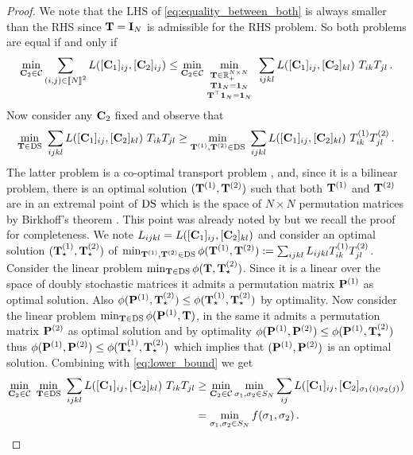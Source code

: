 \begin{proof}
	We note that the LHS of \cref{eq:equality_between_both} is always smaller than the RHS since ${\mathbf{T}} = \mathbf{I}_{N}$ is admissible for the RHS problem. So both problems are equal if and only if
	\begin{equation}
		\min_{\mC_2 \in \mathcal{C}} \sum_{(i,j) \in \integ{N}^2} L([\mC_1]_{ij}, [\mC_2]_{ij}) \leq \min_{\mC_2 \in \mathcal{C}} \min_{\begin{smallmatrix} \mT \in \R_{+}^{N \times N} \\ \mT \one_N = \one_N \\ \mT^\top \one_N = \one_N \end{smallmatrix}} \ \sum_{ijkl} L([\mC_1]_{ij}, [\mC_2]_{kl}) \ T_{ik} T_{jl}\,.
	\end{equation}
	Now consider any ${\mathbf{C}}_2$ fixed and observe that
	\begin{equation}
		\label{eq:lower_bound}
		\min_{\mT \in \DS} \ \sum_{ijkl} L([\mC_1]_{ij}, [\mC_2]_{kl}) \ T_{ik} T_{jl} \geq \min_{\mT^{(1)}, \mT^{(2)} \in \DS} \ \sum_{ijkl} L([\mC_1]_{ij}, [\mC_2]_{kl}) \ T^{(1)}_{ik} T^{(2)}_{jl}\,.
	\end{equation}
	The latter problem is a co-optimal transport problem \citep{redko2020co}, and, since it is a bilinear problem, there is an optimal solution $({\mathbf{T}}^{(1)}, {\mathbf{T}}^{(2)})$ such that both ${\mathbf{T}}^{(1)}$ and ${\mathbf{T}}^{(2)}$ are in an extremal point of $\operatorname{DS}$ which is the space of $N \times N$ permutation matrices by Birkhoff's theorem \citep{birkhoff1946tres}. This point was already noted by \citep{konno1976cutting} but we recall the proof for completeness. We note $L_{ijkl} = L([{\mathbf{C}}_1]_{ij}, [{\mathbf{C}}_2]_{kl})$ and consider an optimal solution $({\mathbf{T}}_\star^{(1)}, {\mathbf{T}}_\star^{(2)})$ of $\min_{{\mathbf{T}}^{(1)}, {\mathbf{T}}^{(2)} \in \operatorname{DS}} \phi({\mathbf{T}}^{(1)}, {\mathbf{T}}^{(2)}):=\sum_{ijkl} L_{ijkl} T^{(1)}_{ik} T^{(2)}_{jl}$. Consider the linear problem $\min_{{\mathbf{T}} \in \operatorname{DS}} \phi({\mathbf{T}}, {\mathbf{T}}_\star^{(2)})$. Since it is a linear over the space of doubly stochastic matrices it admits a permutation matrix ${\mathbf{P}}^{(1)}$ as optimal solution. Also $\phi({\mathbf{P}}^{(1)}, {\mathbf{T}}_\star^{(2)}) \leq \phi({\mathbf{T}}_\star^{(1)}, {\mathbf{T}}_\star^{(2)})$ by optimality. Now consider the linear problem $\min_{{\mathbf{T}} \in \operatorname{DS}} \phi({\mathbf{P}}^{(1)}, {\mathbf{T}})$, in the same it admits a permutation matrix ${\mathbf{P}}^{(2)}$ as optimal solution and by optimality $\phi({\mathbf{P}}^{(1)}, {\mathbf{P}}^{(2)}) \leq \phi({\mathbf{P}}^{(1)}, {\mathbf{T}}_\star^{(2)})$ thus $\phi({\mathbf{P}}^{(1)}, {\mathbf{P}}^{(2)}) \leq \phi({\mathbf{T}}_\star^{(1)}, {\mathbf{T}}_\star^{(2)})$ which implies that $({\mathbf{P}}^{(1)}, {\mathbf{P}}^{(2)})$ is an optimal solution. Combining with \cref{eq:lower_bound} we get
	\begin{equation}
		\label{eq:coot_relax}
		\begin{split}
			\min_{\mC_2 \in \mathcal{C}} \ \min_{\mT \in \DS} \ \sum_{ijkl} L([\mC_1]_{ij}, [\mC_2]_{kl}) \ T_{ik} T_{jl} &\geq \min_{\mC_2 \in \mathcal{C}} \min_{\sigma_1, \sigma_2 \in S_N}  \sum_{ij} L([\mC_1]_{ij}, [\mC_2]_{\sigma_1(i)\sigma_2(j)}) \\ & = \min_{\sigma_1, \sigma_2 \in S_N} f(\sigma_1, \sigma_2) \,.
		\end{split}
	\end{equation}
	

\end{proof}
